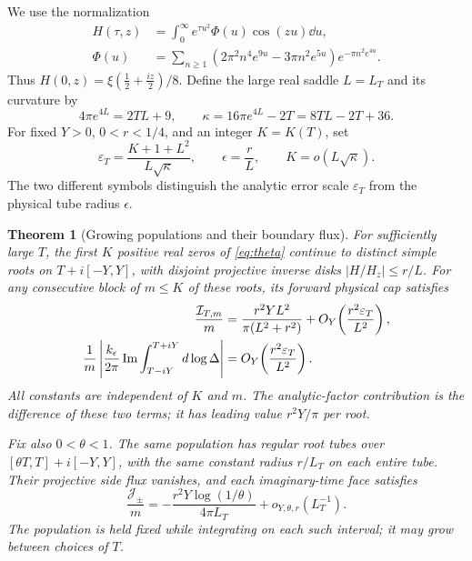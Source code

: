 \documentclass[11pt,letterpaper]{article}
\numberwithin{equation}{section}
\newtheorem{theorem}{Theorem}[section]
\theoremstyle{remark}\newtheorem{remark}[theorem]{Remark}
\newcommand{\im}{\operatorname{Im}}\newcommand{\re}{\operatorname{Re}}
\newcommand{\JJ}{\mathcal J}\newcommand{\QQ}{\mathcal Q}
\begin{document}
We use the normalization
\begin{align}
 H(\tau,z)&=\int_0^\infty e^{\tau u^2}\Phi(u)\cos(zu)\dd u,
 \label{eq:theta}\\
 \Phi(u)&=\sum_{n\ge1}
 (2\pi^2n^4e^{9u}-3\pi n^2e^{5u})e^{-\pi n^2e^{4u}}.
 \nonumber
\end{align}
Thus $H(0,z)=\xi(\frac12+\frac{iz}{2})/8$.
Define the large real saddle $L=L_T$ and its curvature by
\begin{equation}
 4\pi e^{4L}=2TL+9,\qquad
 \kappa=16\pi e^{4L}-2T=8TL-2T+36.
 \label{eq:saddle}
\end{equation}
For fixed $Y>0$, $0<r<1/4$, and an integer $K=K(T)$, set
\begin{equation}
 \varepsilon_T=\frac{K+1+L^2}{L\sqrt\kappa},\qquad
 \epsilon=\frac rL,
 \qquad K=o(L\sqrt\kappa).
 \label{eq:range}
\end{equation}
The two different symbols distinguish the analytic error scale
$\varepsilon_T$ from the physical tube radius $\epsilon$.

\begin{theorem}[Growing populations and their boundary flux]
\label{thm:headline}
For sufficiently large $T$, the first $K$ positive real zeros of
\eqref{eq:theta} continue to distinct simple roots on
$T+i[-Y,Y]$, with disjoint projective inverse disks
$|H/H_z|\le r/L$. For any consecutive block of $m\le K$ of these
roots, its forward physical cap satisfies
\begin{align}
 \frac{\II_{T,m}}m
 &=\frac{r^2YL^2}{\pi(L^2+r^2)}
       +O_Y\!\left(\frac{r^2\varepsilon_T}{L^2}\right),
 \label{eq:capheadline}\\
 \frac1m\left|\frac{k_\epsilon}{2\pi}
       \im\int_{T-iY}^{T+iY}d\log\Delta\right|
 &=O_Y\!\left(\frac{r^2\varepsilon_T}{L^2}\right).
 \label{eq:vheadline}
\end{align}
All constants are independent of $K$ and $m$. The analytic-factor
contribution is the difference of these two terms; it has leading
value $r^2Y/\pi$ per root.

Fix also $0<\theta<1$. The same population has regular root tubes over
$[\theta T,T]+i[-Y,Y]$, with the same constant radius $r/L_T$ on
each entire tube. Their projective side flux vanishes, and each
imaginary-time face satisfies
\begin{equation}
 \frac{\JJ_\pm}{m}
 =-\frac{r^2Y\log(1/\theta)}{4\pi L_T}
       +o_{Y,\theta,r}(L_T^{-1}).
 \label{eq:edgeheadline}
\end{equation}
The population is held fixed while integrating on each such interval;
it may grow between choices of $T$.
\end{theorem}
\end{document}
